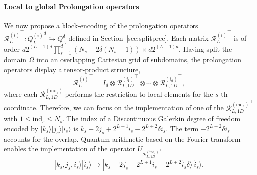 \documentclass[onefignum,onetabnum]{siamart251216}
\newcommand{\ket}[1]{ | #1 \rangle}
\begin{document}
\paragraph{Local to global Prolongation operators}
We now propose a block-encoding of the prolongation operators ${\mathcal{R}^{(i)}_L}^\top : {Q_L^{(i)}}^d \hookrightarrow Q_L^{d}$ defined in Section~\ref{sec:splitprec}. Each matrix ${\mathcal{R}^{(i)}_L}^\top$ is of order $d 2^{(L+1)d} \prod_{s=1}^d (N_s - 2 \delta (N_s-1)) \times d 2^{(L+1)d}$. Having split the domain $\Omega$ into an overlapping Cartesian grid of subdomains, the prolongation operators display a tensor-product structure,
\begin{equation}
    {\mathcal{R}^{(i)}_L}^\top = I_d \otimes {\mathcal{R}^{(i_1)}_{L,1D}}^\top \otimes \cdots \otimes {\mathcal{R}^{(i_d)}_{L,1D}}^\top,
\end{equation}
where each $\mathcal{R}^{(\text{ind}_s)}_{L,1D}$ performs the restriction to local elements for the $s$-th coordinate. Therefore, we can focus on the implementation of one of the ${\mathcal{R}^{(\text{ind}_s)}_{L,1D}}^\top$ with $1 \leq \text{ind}_s \leq N_s$.
The index of a Discontinuous Galerkin degree of freedom encoded by $\ket{k_s}\ket{j_s}\ket{i_s}$ is $k_s + 2 j_s +2^{L+1} i_s - 2^{L+2} \delta i_s$. The term $-2^{L+2} \delta i_s$ accounts for the overlap. Quantum arithmetic based on the Fourier transform \cite{draper2000additionquantumcomputer} enables the implementation of the operator $U_{{\mathcal{R}^{(\text{ind}_s)}_{L,1D}}^\top}$
\begin{equation}
    \ket{k_s,j_s,i_s}\ket{\tilde{i}_s} \rightarrow \ket{k_s + 2j_s +2^{L+1}i_s - 2^{L+2}\tilde{i}_s \delta}\ket{\tilde{i}_s}.
\end{equation}
\end{document}
